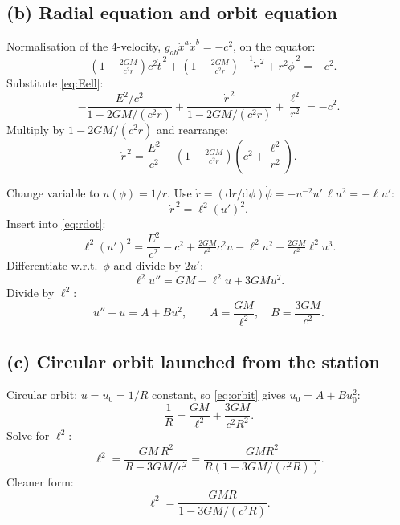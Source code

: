 \documentclass[11pt]{article}
\newcommand{\de}{\mathrm{d}}
\begin{document}
\subsection*{(b) Radial equation and orbit equation}

Normalisation of the 4-velocity, $g_{ab}\dot x^a\dot x^b = -c^2$, on the equator:
\[
-\!\left(1-\tfrac{2GM}{c^2 r}\right)\!c^2\dot t^{\,2} + \!\left(1-\tfrac{2GM}{c^2 r}\right)^{\!-1}\!\dot r^{\,2} + r^2\dot\phi^{\,2} = -c^2.
\]
Substitute \eqref{eq:Eell}:
\[
-\frac{E^2/c^2}{1-2GM/(c^2 r)} + \frac{\dot r^{\,2}}{1-2GM/(c^2 r)} + \frac{\ell^2}{r^2} = -c^2.
\]
Multiply by $1-2GM/(c^2 r)$ and rearrange:
\begin{equation}
\boxed{\;\dot r^{\,2} = \frac{E^2}{c^2} - \!\left(1-\tfrac{2GM}{c^2 r}\right)\!\!\left(c^2 + \frac{\ell^2}{r^2}\right).\;}
\label{eq:rdot}
\end{equation}

Change variable to $u(\phi) = 1/r$. Use $\dot r = (\de r/\de\phi)\dot\phi = -u^{-2}u'\,\ell u^2 = -\ell u'$:
\[
\dot r^{\,2} = \ell^2 (u')^2.
\]
Insert into \eqref{eq:rdot}:
\[
\ell^2 (u')^2 = \frac{E^2}{c^2} - c^2 + \tfrac{2GM}{c^2}c^2 u - \ell^2 u^2 + \tfrac{2GM}{c^2}\ell^2 u^3.
\]
Differentiate w.r.t.\ $\phi$ and divide by $2 u'$:
\[
\ell^2 u'' = GM - \ell^2 u + 3 GM u^2.
\]
Divide by $\ell^2$:
\begin{equation}
\boxed{\;u'' + u = A + B u^2,\qquad A = \frac{GM}{\ell^2},\quad B = \frac{3GM}{c^2}.\;}
\label{eq:orbit}
\end{equation}

\subsection*{(c) Circular orbit launched from the station}

Circular orbit: $u = u_0 = 1/R$ constant, so \eqref{eq:orbit} gives $u_0 = A + B u_0^2$:
\[
\frac{1}{R} = \frac{GM}{\ell^2} + \frac{3GM}{c^2 R^2}.
\]
Solve for $\ell^2$:
\[
\ell^2 = \frac{GM\,R^2}{R - 3GM/c^2} = \frac{GMR^2}{R(1-3GM/(c^2 R))}.
\]
Cleaner form:
\begin{equation}
\ell^2 = \frac{GMR}{1 - 3GM/(c^2 R)}.
\label{eq:ell-circ}
\end{equation}
\end{document}
